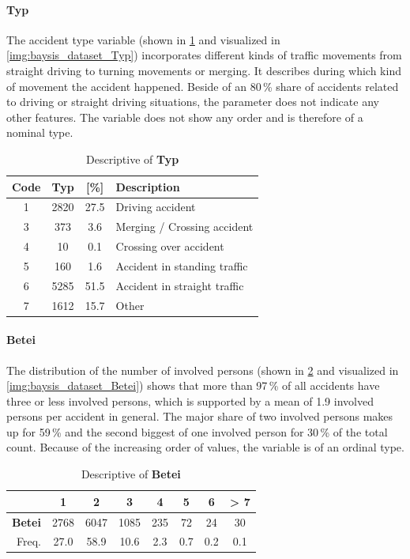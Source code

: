 \paragraph{Typ}
\label{baysis_dataset_Typ}
The accident type variable (shown in \cref{tbl:baysis_dataset_Typ} and visualized in \cref{img:baysis_dataset_Typ}) incorporates different kinds of traffic movements from straight driving to turning movements or merging. It describes during which kind of movement the accident happened. Beside of an 80\,\% share of accidents related to driving or straight driving situations, the parameter does not indicate any other features. The variable does not show any order and is therefore of a nominal type.
\begin{table}[!ht]
	\centering
	\small
	\begin{tabular}{c|c|c|l} 
		\toprule
		Code & \textbf{Typ} & [\%] & Description \\ 
		\midrule
 		1 & 2820	& 27.5	& Driving accident \\ 
 		3 & 373		& 3.6 	& Merging / Crossing accident \\
 		4 & 10		& 0.1	& Crossing over accident \\
 		5 & 160 	& 1.6	& Accident in standing traffic \\
 		6 & 5285	& 51.5	& Accident in straight traffic \\
		7 & 1612	& 15.7 	& Other \\
		\bottomrule
	\end{tabular}
	\caption{Descriptive of \textbf{Typ}}
	\label{tbl:baysis_dataset_Typ}
	\vspace{-8mm}
\end{table}
\paragraph{Betei}
\label{baysis_dataset_Betei}
The distribution of the number of involved persons (shown in \cref{tbl:baysis_dataset_Betei} and visualized in \cref{img:baysis_dataset_Betei}) shows that more than 97\,\% of all accidents have three or less involved persons, which is supported by a mean of 1.9 involved persons per accident in general. The major share of two involved persons makes up for 59\,\% and the second biggest of one involved person for 30\,\% of the total count. Because of the increasing order of values, the variable is of an ordinal type.
\begin{table}[!ht]
	\centering
	\small
	\begin{tabular}{r|ccccccc} 
		\toprule
		 			& 1		& 2		& 3		& 4		& 5		& 6  	& > 7\\ 
		\midrule
		\textbf{Betei}		& 2768	& 6047	& 1085	& 235	& 72 	& 24	& 30 \\ 
 		Freq. 	& 27.0	& 58.9	& 10.6 	& 2.3	& 0.7 	& 0.2 	& 0.1 \\
		\bottomrule
	\end{tabular}
	\caption{Descriptive of \textbf{Betei}}
	\label{tbl:baysis_dataset_Betei}
	\vspace{-8mm}
\end{table}
